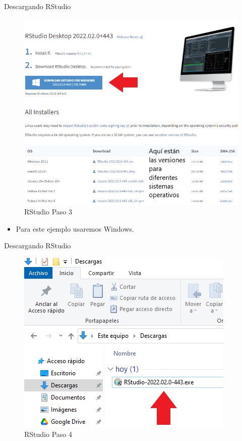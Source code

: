 \documentclass[
  13pt,
  ignorenonframetext,
]{beamer}
\providecommand{\tightlist}{%
  \setlength{\itemsep}{0pt}\setlength{\parskip}{0pt}}
\begin{document}
\begin{frame}{Descargando RStudio}
\label{descargando-rstudio-2}
\begin{figure}[H]
\centering
\includegraphics[keepaspectratio,width=\textwidth, height=.6\textheight]{input/img/img1_7.png}
\caption{RStudio Paso 3}\label{rstudiopaso3}
\end{figure}

\begin{itemize}
\tightlist
\item
  Para este ejemplo usaremos Windows.
\end{itemize}
\end{frame}

\begin{frame}{Descargando RStudio}
\label{descargando-rstudio-3}
\begin{figure}[H]
\centering
\includegraphics[keepaspectratio,width=\textwidth, height=.8\textheight]{input/img/img1_8.png}
\caption{RStudio Paso 4}\label{rstudiopaso4}
\end{figure}
\end{frame}
\end{document}
